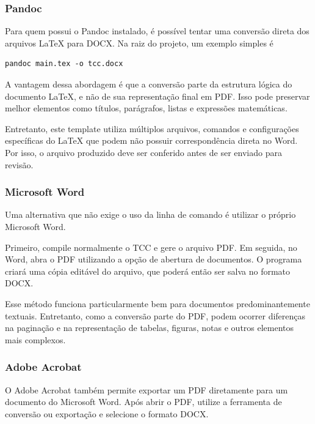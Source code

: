 \subsubsection{Pandoc}
\label{sbsec:conversao_pandoc}

Para quem possui o Pandoc instalado, é possível tentar uma conversão
direta dos arquivos LaTeX para DOCX. Na raiz do projeto, um exemplo
simples é

\begin{verbatim}
pandoc main.tex -o tcc.docx
\end{verbatim}

A vantagem dessa abordagem é que a conversão parte da estrutura lógica
do documento LaTeX, e não de sua representação final em PDF. Isso pode
preservar melhor elementos como títulos, parágrafos, listas e
expressões matemáticas.

Entretanto, este template utiliza múltiplos arquivos, comandos e
configurações específicas do LaTeX que podem não possuir
correspondência direta no Word. Por isso, o arquivo produzido deve ser
conferido antes de ser enviado para revisão.

\subsubsection{Microsoft Word}
\label{sbsec:conversao_word}

Uma alternativa que não exige o uso da linha de comando é utilizar o
próprio Microsoft Word.

Primeiro, compile normalmente o TCC e gere o arquivo PDF. Em seguida,
no Word, abra o PDF utilizando a opção de abertura de documentos. O
programa criará uma cópia editável do arquivo, que poderá então ser
salva no formato DOCX.

Esse método funciona particularmente bem para documentos
predominantemente textuais. Entretanto, como a conversão parte do PDF,
podem ocorrer diferenças na paginação e na representação de tabelas,
figuras, notas e outros elementos mais complexos.

\subsubsection{Adobe Acrobat}
\label{sbsec:conversao_acrobat}

O Adobe Acrobat também permite exportar um PDF diretamente para um
documento do Microsoft Word. Após abrir o PDF, utilize a ferramenta de
conversão ou exportação e selecione o formato DOCX.

